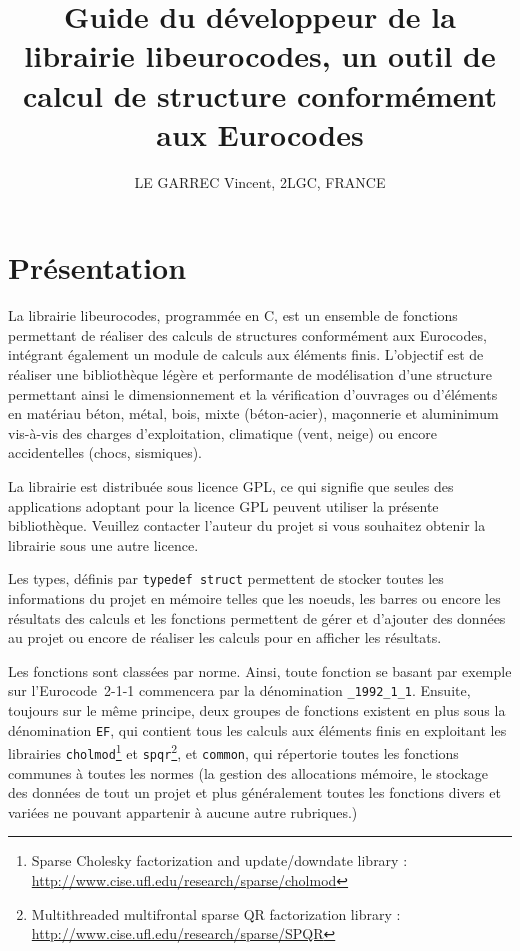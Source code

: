 \documentclass{article}
\begin{document}
\author{LE GARREC Vincent, 2LGC, FRANCE}
\title{Guide du développeur de la librairie libeurocodes, un outil de calcul de structure conformément aux Eurocodes}
\maketitle
\newpage
\section{Présentation}
La librairie libeurocodes, programmée en C, est un ensemble de fonctions permettant de réaliser des calculs de structures conformément aux Eurocodes, intégrant également un module de calculs aux éléments finis. L'objectif est de réaliser une bibliothèque légère et performante de modélisation d'une structure permettant ainsi le dimensionnement et la vérification d'ouvrages ou d'éléments en matériau béton, métal, bois, mixte (béton-acier), maçonnerie et aluminimum vis-à-vis des charges d'exploitation, climatique (vent, neige) ou encore accidentelles (chocs, sismiques).
\par
La librairie est distribuée sous licence GPL, ce qui signifie que seules des applications adoptant pour la licence GPL peuvent utiliser la présente bibliothèque. Veuillez contacter l'auteur du projet si vous souhaitez obtenir la librairie sous une autre licence.
\par
\par
Les types, définis par {\texttt{typedef struct}} permettent de stocker toutes les informations du projet en mémoire telles que les noeuds, les barres ou encore les résultats des calculs et les fonctions permettent de gérer et d'ajouter des données au projet ou encore de réaliser les calculs pour en afficher les résultats.
\par
Les fonctions sont classées par norme. Ainsi, toute fonction se basant par exemple sur l'Eurocode~2-1-1 commencera par la dénomination {\texttt{\_1992\_1\_1}}. Ensuite, toujours sur le même principe, deux groupes de fonctions existent en plus sous la dénomination {\texttt{EF}}, qui contient tous les calculs aux éléments finis en exploitant les librairies {\texttt{cholmod}}\footnote{Sparse Cholesky factorization and update/downdate library : \url{http://www.cise.ufl.edu/research/sparse/cholmod}} et {\texttt{spqr}}\footnote{Multithreaded multifrontal sparse QR factorization library : \url{http://www.cise.ufl.edu/research/sparse/SPQR}}, et {\texttt{common}}, qui répertorie toutes les fonctions communes à toutes les normes (la gestion des allocations mémoire, le stockage des données de tout un projet et plus généralement toutes les fonctions divers et variées ne pouvant appartenir à aucune autre rubriques.)
\newpage
\tableofcontents
\newpage
\end{document}
